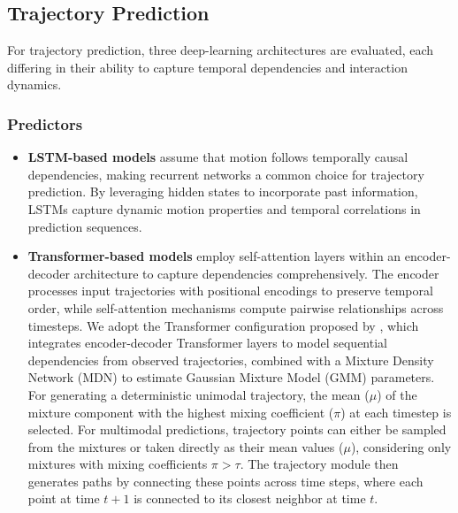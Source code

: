 \subsection{Trajectory Prediction}
\label{sec:Prediction}

For trajectory prediction, three deep-learning architectures are evaluated, each differing in their ability to capture temporal dependencies and interaction dynamics. 

\subsubsection{Predictors}
\begin{itemize}
    \item \textbf{LSTM-based models} assume that motion follows temporally causal dependencies, making recurrent networks a common choice for trajectory prediction. By leveraging hidden states to incorporate past information, LSTMs capture dynamic motion properties and temporal correlations in prediction sequences.
    
    \item \textbf{Transformer-based models} employ self-attention layers within an encoder-decoder architecture to capture dependencies comprehensively. The encoder processes input trajectories with positional encodings to preserve temporal order, while self-attention mechanisms compute pairwise relationships across timesteps. We adopt the Transformer configuration proposed by \cite{Murad}, which integrates encoder-decoder Transformer layers to model sequential dependencies from observed trajectories, combined with a Mixture Density Network (MDN) to estimate Gaussian Mixture Model (GMM) parameters. For generating a deterministic unimodal trajectory, the mean ($\mu$) of the mixture component with the highest mixing coefficient ($\pi$) at each timestep is selected. For multimodal predictions, trajectory points can either be sampled from the mixtures or taken directly as their mean values ($\mu$), considering only mixtures with mixing coefficients $\pi > \tau$. The trajectory module then generates paths by connecting these points across time steps, where each point at time $t+1$ is connected to its closest neighbor at time $t$.
    

\end{itemize}
